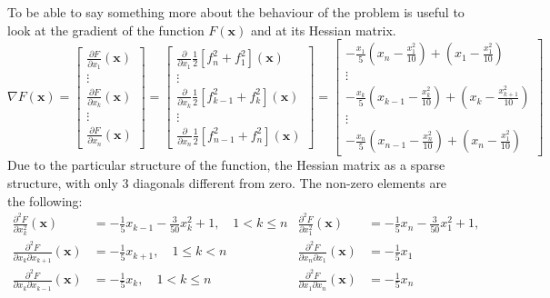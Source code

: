 To be able to say something more about the behaviour of the problem is useful to look at the gradient of the function $F(\mathbf{x})$ and at its Hessian matrix.
\begin{equation*}
    \nabla F(\mathbf{x}) = 
    \begin{bmatrix}
        \frac{\partial F}{\partial x_1}(\mathbf{x}) \\
        \vdots \\
        \frac{\partial F}{\partial x_k}(\mathbf{x}) \\
        \vdots \\
        \frac{\partial F}{\partial x_n}(\mathbf{x})
    \end{bmatrix}
    =
    \begin{bmatrix}
        \frac{\partial}{\partial x_1} \frac{1}{2}\left[f_n^2 + f_1^2\right] (\mathbf{x})\\
        \vdots \\
        \frac{\partial}{\partial x_k} \frac{1}{2}\left[f_{k-1}^2 + f_k^2\right] (\mathbf{x})\\
        \vdots \\
        \frac{\partial}{\partial x_n}  \frac{1}{2}\left[f_{n-1}^2 + f_n^2\right] (\mathbf{x})
    \end{bmatrix}
    =
    \begin{bmatrix}
        -\frac{x_1}{5}\left(x_n - \frac{x_1^2}{10}\right) + \left(x_1 - \frac{x_1^2}{10}\right) \\
        \vdots \\
        -\frac{x_k}{5}\left(x_{k-1} - \frac{x_k^2}{10}\right) + \left(x_k - \frac{x_{k+1}^2}{10}\right) \\
        \vdots \\
        -\frac{x_n}{5}\left(x_{n-1} - \frac{x_n^2}{10}\right) + \left(x_n - \frac{x_1^2}{10}\right)
    \end{bmatrix}
\end{equation*}
Due to the particular structure of the function, the Hessian matrix as a sparse structure, with only 3 diagonals different from zero. The non-zero elements are the following:
\begin{align*}
    \frac{\partial^2 F}{\partial x_k^2} (\mathbf{x}) &= -\frac{1}{5}x_{k-1} - \frac{3}{50}x_k^2  + 1, \quad 1 < k \leq n  &
    \frac{\partial^2 F}{\partial x_1^2} (\mathbf{x}) &= -\frac{1}{5}x_{n} - \frac{3}{50}x_1^2  + 1, \\
    \frac{\partial^2 F}{\partial x_k \partial x_{k+1}} (\mathbf{x}) &= -\frac{1}{5}x_{k+1}, \quad 1 \leq k < n  &
    \frac{\partial^2 F}{\partial x_n \partial x_1}(\mathbf{x}) &= -\frac{1}{5}x_1  \\
    \frac{\partial^2 F}{\partial x_k \partial x_{k-1}}(\mathbf{x}) &= -\frac{1}{5}x_{k}, \quad 1 < k \leq n  &
    \frac{\partial^2 F}{\partial x_1 \partial x_{n}}(\mathbf{x}) &= -\frac{1}{5}x_{n}
\end{align*}
